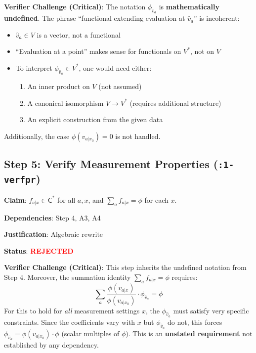\documentclass[11pt,a4paper]{article}
\theoremstyle{definition}
\newcommand{\Cstar}{\mathsf{C}^*}
\begin{document}
\begin{challengebox}
\textbf{Verifier Challenge (Critical)}: The notation $\phi_{\hat{v}_a}$ is \textbf{mathematically undefined}. The phrase ``functional extending evaluation at $\hat{v}_a$'' is incoherent:
\begin{itemize}
    \item $\hat{v}_a \in V$ is a vector, not a functional
    \item ``Evaluation at a point'' makes sense for functionals on $V^*$, not on $V$
    \item To interpret $\phi_{\hat{v}_a} \in V^*$, one would need either:
    \begin{enumerate}
        \item An inner product on $V$ (not assumed)
        \item A canonical isomorphism $V \to V^*$ (requires additional structure)
        \item An explicit construction from the given data
    \end{enumerate}
\end{itemize}
Additionally, the case $\phi(v_{a|x_0}) = 0$ is not handled.
\end{challengebox}

\subsection{Step 5: Verify Measurement Properties (\texttt{:1-verfpr})}

\begin{rejectedbox}
\textbf{Claim}: $f_{a|x} \in \Cstar$ for all $a, x$, and $\sum_a f_{a|x} = \phi$ for each $x$.

\textbf{Dependencies}: Step 4, A3, A4

\textbf{Justification}: Algebraic rewrite

\textbf{Status}: \textcolor{red}{\textbf{REJECTED}}
\end{rejectedbox}

\begin{challengebox}
\textbf{Verifier Challenge (Critical)}: This step inherits the undefined notation from Step 4. Moreover, the summation identity $\sum_a f_{a|x} = \phi$ requires:
\[
\sum_a \frac{\phi(v_{a|x})}{\phi(v_{a|x_0})} \cdot \phi_{\hat{v}_a} = \phi
\]
For this to hold for \emph{all} measurement settings $x$, the $\phi_{\hat{v}_a}$ must satisfy very specific constraints. Since the coefficients vary with $x$ but $\phi_{\hat{v}_a}$ do not, this forces $\phi_{\hat{v}_a} = \phi(v_{a|x_0}) \cdot \phi$ (scalar multiples of $\phi$). This is an \textbf{unstated requirement} not established by any dependency.
\end{challengebox}
\end{document}
